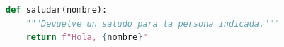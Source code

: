 \begin{lstlisting}[language=Python, caption={Ejemplo de función en Python.}, label={lst:hola}]
def saludar(nombre):
    """Devuelve un saludo para la persona indicada."""
    return f"Hola, {nombre}"
\end{lstlisting}
